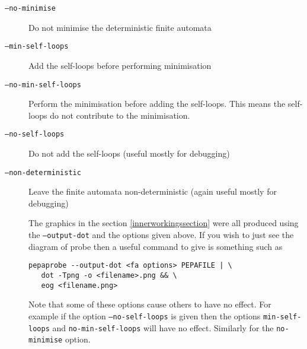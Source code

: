 \documentclass[10pt,a4paper]{article}
\begin{document}
\begin{description}
\item[\texttt{--no-minimise} ] Do not minimise the deterministic finite automata
\item[\texttt{--min-self-loops}] Add the self-loops before performing minimisation
\item[\texttt{--no-min-self-loops}] Perform the minimisation before adding the
self-loops. This means the self-loops do not contribute to the minimisation.
\item[\texttt{--no-self-loops}]  Do not add the self-loops (useful mostly for debugging)
\item[\texttt{--non-deterministic}] Leave the finite automata non-deterministic (again useful mostly for debugging)

The graphics in the section \ref{innerworkingssection} were all produced using
the \texttt{--output-dot} and the options given above.
If you wish to just see the diagram of probe then a useful command to give is something such as

\begin{verbatim}
pepaprobe --output-dot <fa options> PEPAFILE | \ 
   dot -Tpng -o <filename>.png && \ 
   eog <filename.png>
\end{verbatim}

Note that some of these options cause others to have no effect.
For example if the option \texttt{--no-self-loops} is given then
the options \texttt{min-self-loops} and \texttt{no-min-self-loops} will
have no effect. Similarly for the \texttt{no-minimise} option.

\end{description}





\end{document}
